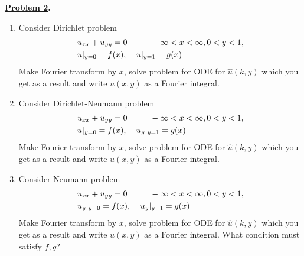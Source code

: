 \documentclass{article}
\theoremstyle{definition}
\newenvironment{boldenv}{\bfseries\boldmath}{}
\begin{document}
\begin{boldenv}
    \underline{Problem 2}. 
    \begin{enumerate}
        \item Consider Dirichlet problem \begin{align}
        & u_{xx} + u_{yy} = 0 \mkern 50mu -\infty < x < \infty, 0 < y < 1,\\
        & u|_{y=0} = f(x), \mkern 20mu u|_{y=1} = g(x)
        \end{align}
        Make Fourier transform by $x$, solve problem for ODE for $\hat{u}(k, y)$ which you get as a result and write $u(x,y)$ as a Fourier integral.
        \item Consider Dirichlet-Neumann problem \begin{align}
        & u_{xx} + u_{yy} = 0 \mkern 50mu -\infty < x < \infty, 0 < y < 1,\\
        & u|_{y=0} = f(x), \mkern 20mu u_y|_{y=1} = g(x)
        \end{align}
        Make Fourier transform by $x$, solve problem for ODE for $\hat{u}(k, y)$ which you get as a result and write $u(x,y)$ as a Fourier integral.
        \item Consider Neumann problem \begin{align}
        & u_{xx} + u_{yy} = 0 \mkern 50mu -\infty < x < \infty, 0 < y < 1,\\
        & u_y|_{y=0} = f(x), \mkern 20mu u_y|_{y=1} = g(x)
        \end{align}
        Make Fourier transform by $x$, solve problem for ODE for $\hat{u}(k, y)$ which you get as a result and write $u(x,y)$ as a Fourier integral. What condition must satisfy $f, g$?
    \end{enumerate}
\end{boldenv}
\end{document}
